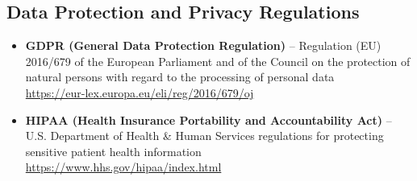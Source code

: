 \documentclass[11pt,a4paper]{article}
\begin{document}
\subsection{Data Protection and Privacy Regulations}
\begin{itemize}[leftmargin=*]
    \item \textbf{GDPR (General Data Protection Regulation)} -- Regulation (EU) 2016/679 of the European Parliament and of the Council on the protection of natural persons with regard to the processing of personal data \\
    \url{https://eur-lex.europa.eu/eli/reg/2016/679/oj}
    
    \item \textbf{HIPAA (Health Insurance Portability and Accountability Act)} -- U.S. Department of Health \& Human Services regulations for protecting sensitive patient health information \\
    \url{https://www.hhs.gov/hipaa/index.html}
\end{itemize}
\end{document}
